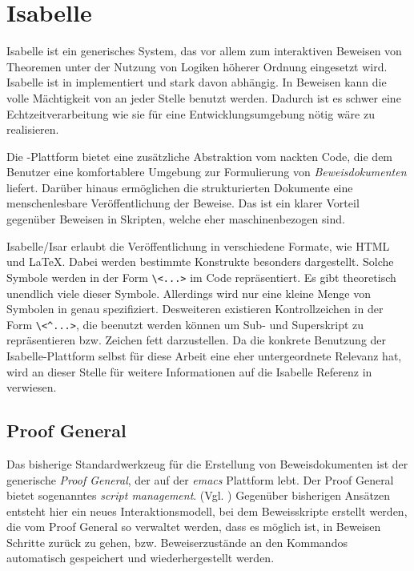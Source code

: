 \section{Isabelle}

Isabelle ist ein generisches System, das vor allem zum interaktiven Beweisen von Theoremen unter
der Nutzung von Logiken höherer Ordnung eingesetzt wird. Isabelle ist in  implementiert und
stark davon abhängig. In Beweisen kann die volle Mächtigkeit von  an jeder Stelle benutzt
werden. Dadurch ist es schwer eine Echtzeitverarbeitung wie sie für eine Entwicklungsumgebung nötig
wäre zu realisieren.

Die -Plattform bietet eine zusätzliche Abstraktion vom nackten  Code, die dem
Benutzer eine komfortablere Umgebung zur Formulierung von \textit{Beweisdokumenten} liefert. Darüber
hinaus ermöglichen die strukturierten Dokumente eine menschenlesbare Veröffentlichung der Beweise.
Das ist ein klarer Vorteil gegenüber Beweisen in  Skripten, welche eher maschinenbezogen
sind.

Isabelle/Isar erlaubt die Veröffentlichung in verschiedene Formate, wie HTML und LaTeX. Dabei werden
bestimmte Konstrukte besonders dargestellt. Solche Symbole werden in der Form
\texttt{\textbackslash\textless ...\textgreater} im Code repräsentiert. Es gibt theoretisch
unendlich viele dieser Symbole. Allerdings wird nur eine kleine Menge von Symbolen in
\cite{isabelle} genau spezifiziert. Desweiteren existieren Kontrollzeichen in der Form
\texttt{\textbackslash\textless\textasciicircum ...\textgreater}, die beenutzt werden können um
Sub- und Superskript zu repräsentieren bzw. Zeichen fett darzustellen. Da die konkrete Benutzung der
Isabelle-Plattform selbst für diese Arbeit eine eher untergeordnete Relevanz hat, wird an dieser
Stelle für weitere Informationen auf die Isabelle Referenz in \cite{isabelle} verwiesen.

\subsection{Proof General}

Das bisherige Standardwerkzeug für die Erstellung von Beweisdokumenten ist der generische
\textit{Proof General}, der auf der \textit{emacs} Plattform lebt. Der Proof General bietet
sogenanntes \textit{script management}. (Vgl. \cite{sm}) Gegenüber bisherigen Ansätzen entsteht hier
ein neues Interaktionsmodell, bei dem Beweisskripte erstellt werden, die vom Proof General so
verwaltet werden, dass es möglich ist, in Beweisen Schritte zurück zu gehen, bzw. Beweiserzustände
an den Kommandos automatisch gespeichert und wiederhergestellt werden. 

